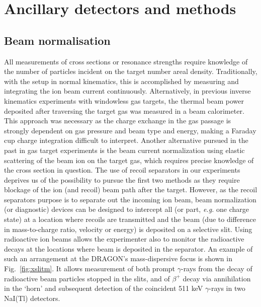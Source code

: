 \section{Ancillary detectors and methods}

\subsection{Beam normalisation}

All measurements of cross sections or resonance strengths require knowledge of the number of particles incident on the target number areal density. Traditionally, with the setup in normal kinematics, this is accomplished by measuring and integrating the ion beam current continuously. Alternatively, in previous inverse kinematics experiments with windowless gas targets, the thermal beam power deposited after traversing the target gas was measured in a beam calorimeter. This approach was necessary as the charge exchange in the gas passage is strongly dependent on gas pressure and beam type and energy, making a Faraday cup charge integration difficult to interpret. Another alternative pursued in the past in gas target experiments is the beam current normalization using elastic scattering of the beam ion on the target gas, which requires precise knowledge of the cross section in question. The use of recoil separators in our experiments deprives us of the possibility to pursue the first two methods as they require blockage of the ion (and recoil) beam path after the target. However, as the recoil separators purpose is to separate out the incoming ion beam, beam normalization (or diagnostic) devices can be designed to intercept all (or part, {\it e.g.} one charge state) at a location where recoils are transmitted and the beam (due to difference in mass-to-charge ratio, velocity or energy) is deposited on a selective slit. Using radioactive ion beams allows the experimenter also to monitor the radioactive decays at the locations where beam is deposited in the separator. An example of such an arrangement at the DRAGON's mass-dispersive focus is shown in Fig.\ \ref{fig:xslitm}. It allows measurement of both prompt $\gamma$-rays from the decay of radioactive beam particles stopped in the slits, and of $\beta^+$ decay via annihilation in the `horn' and subsequent detection of the coincident 511 keV $\gamma$-rays in two NaI(Tl) detectors. 
%
